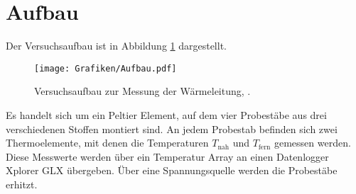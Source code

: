 \section{Aufbau}
Der Versuchsaufbau ist in Abbildung \ref{fig:Aufbau} dargestellt.
\begin{figure}[h]
  \centering
  \texttt{[image: Grafiken/Aufbau.pdf]}
  \caption{Versuchsaufbau zur Messung der Wärmeleitung, \cite{1}.}
  \label{fig:Aufbau}
\end{figure}
Es handelt sich um ein Peltier Element, auf dem vier Probestäbe aus drei verschiedenen Stoffen montiert sind. An jedem Probestab befinden sich zwei Thermoelemente, mit denen die Temperaturen $T_\text{nah}$ und $T_\text{fern}$ gemessen werden. Diese Messwerte werden über ein Temperatur Array an einen Datenlogger Xplorer GLX übergeben. Über eine Spannungsquelle werden die Probestäbe erhitzt. 